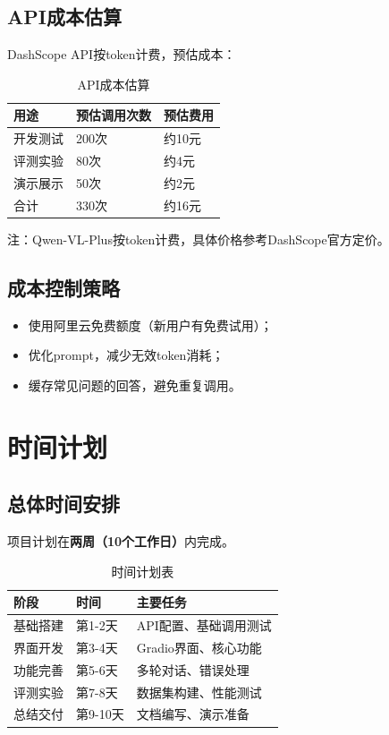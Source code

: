 \subsection{API成本估算}

DashScope API按token计费，预估成本：

\begin{table}[htbp]
  \centering
  \caption{API成本估算}
  \label{tab:api_cost}
  \begin{tabular}{|l|l|l|}
    \hline
    \textbf{用途} & \textbf{预估调用次数} & \textbf{预估费用} \\
    \hline
    开发测试 & 200次 & 约10元 \\
    \hline
    评测实验 & 80次 & 约4元 \\
    \hline
    演示展示 & 50次 & 约2元 \\
    \hline
    合计 & 330次 & 约16元 \\
    \hline
  \end{tabular}
\end{table}

注：Qwen-VL-Plus按token计费，具体价格参考DashScope官方定价。

\subsection{成本控制策略}

\begin{itemize}
  \item 使用阿里云免费额度（新用户有免费试用）；
  \item 优化prompt，减少无效token消耗；
  \item 缓存常见问题的回答，避免重复调用。
\end{itemize}

\section{时间计划}
\label{sec:timeline}

\subsection{总体时间安排}

项目计划在\textbf{两周（10个工作日）}内完成。

\begin{table}[htbp]
  \centering
  \caption{时间计划表}
  \label{tab:timeline}
  \begin{tabular}{|l|l|l|}
    \hline
    \textbf{阶段} & \textbf{时间} & \textbf{主要任务} \\
    \hline
    基础搭建 & 第1-2天 & API配置、基础调用测试 \\
    \hline
    界面开发 & 第3-4天 & Gradio界面、核心功能 \\
    \hline
    功能完善 & 第5-6天 & 多轮对话、错误处理 \\
    \hline
    评测实验 & 第7-8天 & 数据集构建、性能测试 \\
    \hline
    总结交付 & 第9-10天 & 文档编写、演示准备 \\
    \hline
  \end{tabular}
\end{table}

